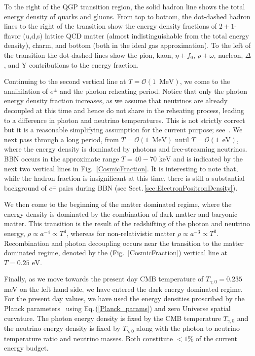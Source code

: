 \documentclass[universe,article,submit,moreauthors,pdftex,a4paper]{Definitions/mdpi}
\newcommand{\MeV}{\text{ MeV}}
\newcommand{\keV}{\text{ keV}}
\newcommand{\eV}{\text{ eV}}
\newcommand{\req}[1]{Eq.\,(\ref{#1})}
\newcommand*{\rf}[1]{Fig.~{\ref{#1}}}
\newcommand*{\rsec}[1]{Sect.\,{\ref{#1}}}
\begin{document}
To the right of the QGP transition region, the solid hadron line shows the total energy density of quarks and gluons. From top to bottom, the dot-dashed hadron lines to the right of the transition show the energy density fractions of $2+1$-flavor (u,d,s) lattice QCD matter (almost indistinguishable from the total energy density), charm, and bottom (both in the ideal gas approximation). To the left of the transition the dot-dashed lines show the pion, kaon, $\eta+f_0$, $\rho+\omega$, nucleon, $\Delta$, and Y contributions to the energy fraction.

Continuing to the second vertical line at $T=\mathcal{O}(1\, \MeV)$, we come to the annihilation of $e^\pm$ and the photon reheating period. Notice that only the photon energy density fraction increases, as we assume that neutrinos are already decoupled at this time and hence do not share in the reheating process, leading to a difference in photon and neutrino temperatures. This is not strictly correct but it is a reasonable simplifying assumption for the current purpose; see~\cite{Mangano:2005cc,Fornengo:1997wa,Mangano:2001iu,Birrell:2012gg}. We next pass through a long period, from $T=\mathcal{O}(1\, \MeV)$ until $T=\mathcal{O}(1\, \eV)$, where the energy density is dominated by photons and free-streaming neutrinos. BBN occurs in the approximate range $T=40-70\keV$ and is indicated by the next two vertical lines in \rf{CosmicFraction}. It is interesting to note that, while the hadron fraction is insignificant at this time, there is still a substantial background of $e^\pm$ pairs during BBN (see \rsec{sec:ElectronPositronDensity}). 

We then come to the beginning of the matter dominated regime, where the energy density is dominated by the combination of dark matter and baryonic matter. This transition is the result of the redshifting of the photon and neutrino energy, $\rho\propto a^{-4} \propto T^4$, whereas for non-relativistic matter $\rho\propto a^{-3}\propto T^3$. Recombination and photon decoupling occurs near the transition to the matter dominated regime, denoted by the (\rf{CosmicFraction}) vertical line at $T=0.25\eV$.

Finally, as we move towards the present day CMB temperature of $T_{\gamma,0}=0.235$ meV on the left hand side, we have entered the dark energy dominated regime. For the present day values, we have used the energy densities proscribed by the Planck parameters~\cite{Planck:2013pxb} using \req{Planck_params} and zero Universe spatial curvature. The photon energy density is fixed by the CMB temperature $T_{\gamma,0}$ and the neutrino energy density is fixed by $T_{\gamma,0}$ along with the photon to neutrino temperature ratio and neutrino masses. Both constitute $<1\%$ of the current energy budget.
\end{document}
